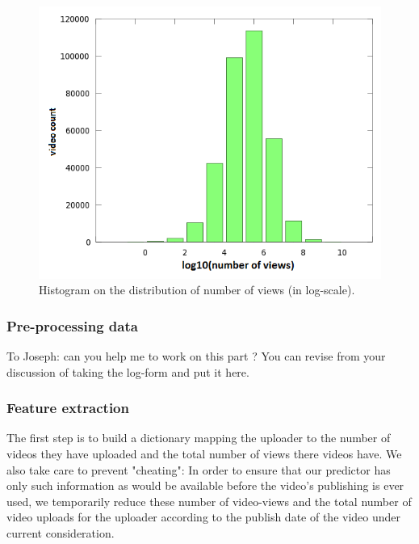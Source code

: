 \documentclass{article} %
\begin{document}
		\begin{figure}[!h]
			\begin{center}
				\includegraphics[width=.75\textwidth,clip]{DistributionOfViews.png}				
			\end{center}
			\caption{Histogram on the distribution of number of views (in log-scale).}
			\label{fig:logNoOfViews}
		\end{figure}
				
		\subsubsection{Pre-processing data}
		\label{sec:preprocessing}
		To Joseph: can you help me to work on this part ? You can revise from your discussion of taking the log-form and put it here.
		
		\subsubsection{Feature extraction}
		The first step is to build a dictionary mapping the uploader to the number of videos they have uploaded and the total number of views there videos have. We also take care to prevent "cheating":  In order to ensure that our predictor has only such information as would be available before the video's publishing is ever used, we temporarily reduce these number of video-views and the total number of video uploads for the uploader according to the publish date of the video under current consideration.
\end{document}
